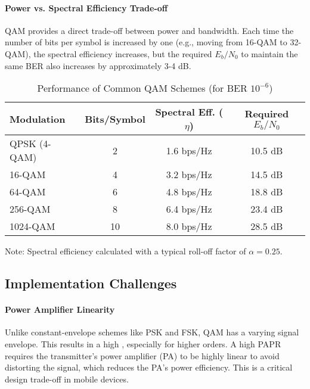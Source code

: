 \paragraph{Power vs. Spectral Efficiency Trade-off}
QAM provides a direct trade-off between power and bandwidth. Each time the number of bits per symbol is increased by one (e.g., moving from 16-QAM to 32-QAM), the spectral efficiency increases, but the required $E_b/N_0$ to maintain the same BER also increases by approximately 3-4 dB.

\begin{table}[H]
    \centering
    \caption{Performance of Common QAM Schemes (for BER $10^{-6}$)}
    \label{tab:qam-performance}
    \begin{tabular}{@{}lccc@{}}
        \toprule
        \tableheaderfont Modulation & \tableheaderfont Bits/Symbol & \tableheaderfont Spectral Eff. ($\eta$) & \tableheaderfont Required $E_b/N_0$ \\
        \midrule
        QPSK (4-QAM) & 2 & 1.6 bps/Hz & 10.5 dB \\
        16-QAM & 4 & 3.2 bps/Hz & 14.5 dB \\
        64-QAM & 6 & 4.8 bps/Hz & 18.8 dB \\
        256-QAM & 8 & 6.4 bps/Hz & 23.4 dB \\
        1024-QAM & 10 & 8.0 bps/Hz & 28.5 dB \\
        \bottomrule
    \end{tabular}
    \par\vspace{0.5em}
    \small Note: Spectral efficiency calculated with a typical roll-off factor of $\alpha=0.25$.
\end{table}


\subsection{Implementation Challenges}

\paragraph{Power Amplifier Linearity}
Unlike constant-envelope schemes like PSK and FSK, QAM has a varying signal envelope. This results in a high , especially for higher orders. A high PAPR requires the transmitter's power amplifier (PA) to be highly linear to avoid distorting the signal, which reduces the PA's power efficiency. This is a critical design trade-off in mobile devices.

